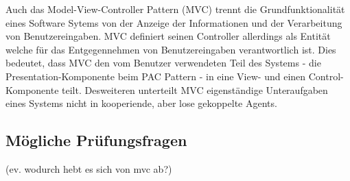Auch das Model-View-Controller Pattern (MVC) trennt die Grundfunktionalität eines Software Sytems von der Anzeige der Informationen und der Verarbeitung von Benutzereingaben. MVC definiert seinen Controller allerdings als Entität welche für das Entgegennehmen von Benutzereingaben verantwortlich ist. Dies bedeutet, dass MVC den vom Benutzer verwendeten Teil des Systems - die Presentation-Komponente beim PAC Pattern - in eine View- und einen Control-Komponente teilt. Desweiteren unterteilt MVC eigenständige Unteraufgaben eines Systems nicht in kooperiende, aber lose gekoppelte Agents.

\subsection*{Mögliche Prüfungsfragen}


(ev. wodurch hebt es sich von mvc ab?)
